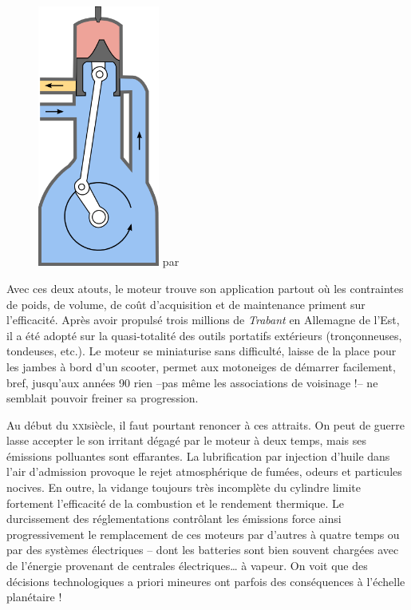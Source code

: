 	\begin{figure}
		\begin{center}
			\includegraphics[width=4cm]{images/admission_carter.png}
			{ \pd par }
			\label{fig_admission_carter}
		\end{center}
	\end{figure}

	Avec ces deux atouts, le moteur trouve son application partout où les contraintes de poids, de volume, de coût d’acquisition et de maintenance priment sur l’efficacité. Après avoir propulsé trois millions de \textit{Trabant} en Allemagne de l’Est, il a été adopté sur la quasi-totalité des outils portatifs extérieurs (tronçonneuses, tondeuses, etc.). Le moteur se miniaturise sans difficulté, laisse de la place pour les jambes à bord d’un scooter, permet aux motoneiges de démarrer facilement, bref, jusqu’aux années 90 rien --pas même les associations de voisinage !-- ne semblait pouvoir freiner sa progression.

	Au début du \textsc{xxi}\ieme siècle, il faut pourtant renoncer à ces attraits. On peut de guerre lasse accepter le son irritant dégagé par le moteur à deux temps, mais ses émissions polluantes sont effarantes. La lubrification par injection d’huile dans l’air d’admission provoque le rejet atmosphérique de fumées, odeurs et particules nocives. En outre, la vidange toujours très incomplète du cylindre limite fortement l’efficacité de la combustion et le rendement thermique. Le durcissement des réglementations contrôlant les émissions force ainsi progressivement le remplacement de ces moteurs par d’autres à quatre temps ou par des systèmes électriques -- dont les batteries sont bien souvent chargées avec de l’énergie provenant de centrales électriques… à vapeur. On voit que des décisions technologiques a priori mineures ont parfois des conséquences à l’échelle planétaire !
	
\atendofhistorysection
